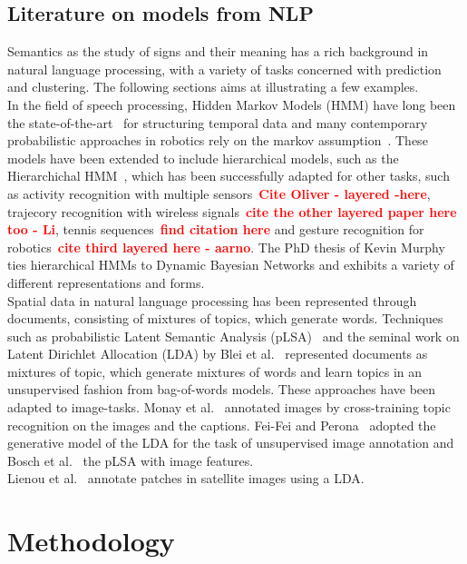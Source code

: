 \documentclass[twocolumn,letterpaper]{IEEEAerospaceCLS}  %
\newcommand\todo[1]{\textbf{\textcolor{red}{#1}}}
\begin{document}
\subsection{Literature on models from NLP}
Semantics as the study of signs and their meaning has a rich background in natural language processing, with a variety of tasks concerned with prediction and clustering. The following sections aims at illustrating a few examples.\\
In the field of speech processing, Hidden Markov Models (HMM) have long been the state-of-the-art~\cite{rabiner_tutorial_1989} for structuring temporal data and many contemporary probabilistic approaches in robotics rely on the markov assumption~\cite{thrun_probabilistic_2005}. These models have been extended to include hierarchical models, such as the Hierarchichal HMM~\cite{fine_hierarchical_1998}, which has been successfully adapted for other tasks, such as activity recognition with multiple sensors~\todo{Cite Oliver - layered -here}, trajecory recognition with wireless signals~\todo{cite the other layered paper here too - Li}, tennis sequences~\todo{find citation here} and gesture recognition for robotics~\todo{cite third layered here - aarno}. The PhD thesis of Kevin Murphy~\cite{murphy_dynamic_2002} ties hierarchical HMMs to Dynamic Bayesian Networks and exhibits a variety of different representations and forms.\\
Spatial data in natural language processing has been represented through documents, consisting of mixtures of topics, which generate words. Techniques such as probabilistic Latent Semantic Analysis (pLSA)~\cite{hofmann_probabilistic_1999} and the seminal work on Latent Dirichlet Allocation (LDA) by Blei et al.~\cite{blei_latent_2003} represented documents as mixtures of topic, which generate mixtures of words and learn topics in an unsupervised fashion from bag-of-words models. These approaches have been adapted to image-tasks. Monay et al.~\cite{monay_plsa-based_2004} annotated images by cross-training topic recognition on the images and the captions. Fei-Fei and Perona~\cite{fei-fei_bayesian_2005} adopted the generative model of the LDA for the task of unsupervised image annotation and Bosch et al.~\cite{bosch_scene_2006} the pLSA with image features.\\
Lienou et al.~\cite{lienou_semantic_2010} annotate patches in satellite images using a LDA. 
\section{Methodology} \label{sec:Met}
\end{document}
